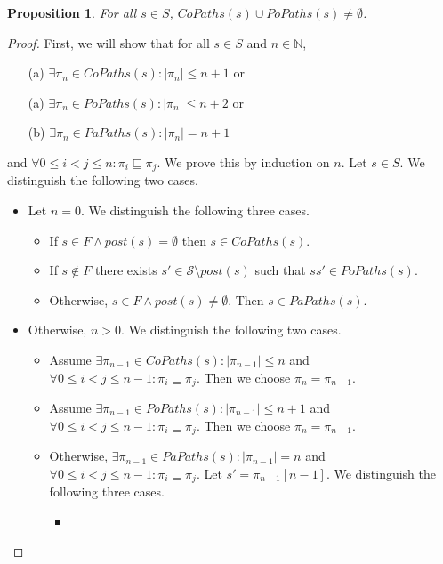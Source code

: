 \documentclass[12pt]{article}
\newtheorem{proposition}{Proposition}
\theoremstyle{definition}
\newenvironment{franck}{\color{red}}{\color{black}}
\begin{document}
\begin{franck}
\begin{proposition}
\label{proposition:there-are-paths}
For all $s \in S$, $\mathit{CoPaths}(s) \cup \mathit{PoPaths}(s) \not= \emptyset$.
\end{proposition}
\begin{proof}
First, we will show that for all $s \in S$ and $n \in \mathbb{N}$,
\begin{itemize}
\item[(a)]
$\exists \pi_n \in \mathit{CoPaths}(s) : |\pi_n| \leq n + 1$ or
\item[(a)]
$\exists \pi_n \in \mathit{PoPaths}(s) : |\pi_n| \leq n + 2$ or
\item[(b)]
$\exists \pi_n \in \mathit{PaPaths}(s) : |\pi_n| = n + 1$
\end{itemize}
and $\forall 0 \leq i < j \leq n: \pi_i \sqsubseteq \pi_j$.  We prove this by induction on $n$.  Let $s \in S$.   We distinguish the following two cases.
\begin{itemize}
\item 
Let $n = 0$.  We distinguish the following three cases.
\begin{itemize}
\item 
If $s \in F \wedge \mathit{post}(s) = \emptyset$ then $s \in \mathit{CoPaths}(s)$.
\item
If $s \not\in F$ there exists $s' \in \mathcal{S} \setminus \mathit{post}(s)$ such that $s s' \in \mathit{PoPaths}(s)$.
\item 
Otherwise, $s \in F \wedge \mathit{post}(s) \not= \emptyset$.   Then $s \in \mathit{PaPaths}(s)$.
\end{itemize} 
\item
Otherwise, $n > 0$.  We distinguish the following two cases.
\begin{itemize}
\item 
Assume $\exists \pi_{n-1} \in \mathit{CoPaths}(s) : |\pi_{n-1}| \leq n$ and  $\forall 0 \leq i < j \leq n - 1: \pi_i \sqsubseteq \pi_j$.  Then we choose $\pi_n = \pi_{n-1}$.
\item 
Assume $\exists \pi_{n-1} \in \mathit{PoPaths}(s) : |\pi_{n-1}| \leq n + 1$ and  $\forall 0 \leq i < j \leq n - 1: \pi_i \sqsubseteq \pi_j$.  Then we choose $\pi_n = \pi_{n-1}$.
\item
Otherwise, $\exists \pi_{n-1} \in \mathit{PaPaths}(s) : |\pi_{n-1}| = n$  and $\forall 0 \leq i < j \leq n - 1: \pi_i \sqsubseteq \pi_j$.  Let $s' = \pi_{n-1}[n-1]$.  We distinguish the following three cases.
\begin{itemize}
\item 

\end{itemize}
\end{itemize}
\end{itemize}
\end{proof}
\end{franck}
\end{document}
